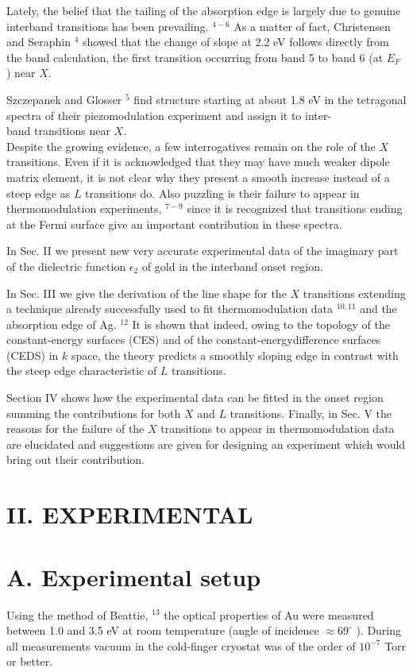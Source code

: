 \documentclass[10pt]{article}
\begin{document}
Lately, the belief that the tailing of the absorption edge is largely due to genuine interband transitions has been prevailing. ${ }^{4-6}$ As a matter of fact, Christensen and Seraphin ${ }^{4}$ showed that the change of slope at 2.2 eV follows directly from the band calculation, the first transition occurring from band 5 to band 6 (at $E_{F}$ ) near $X$.

Szczepanek and Glosser ${ }^{5}$ find structure starting at about 1.8 eV in the tetragonal spectra of their piezomodulation experiment and assign it to inter-\\
band transitions near $X$.\\
Despite the growing evidence, a few interrogatives remain on the role of the $X$ transitions. Even if it is acknowledged that they may have much weaker dipole matrix element, it is not clear why they present a smooth increase instead of a steep edge as $L$ transitions do. Also puzzling is their failure to appear in thermomodulation experiments, ${ }^{7-9}$ since it is recognized that transitions ending at the Fermi surface give an important contribution in these spectra.

In Sec. II we present new very accurate experimental data of the imaginary part of the dielectric function $\epsilon_{2}$ of gold in the interband onset region.

In Sec. III we give the derivation of the line shape for the $X$ transitions extending a technique already successfully used to fit thermomodulation data ${ }^{10,11}$ and the absorption edge of Ag. ${ }^{12}$ It is shown that indeed, owing to the topology of the constant-energy surfaces (CES) and of the constant-energydifference surfaces (CEDS) in $k$ space, the theory predicts a smoothly sloping edge in contrast with the steep edge characteristic of $L$ transitions.

Section IV shows how the experimental data can be fitted in the onset region summing the contributions for both $X$ and $L$ transitions. Finally, in Sec. V the reasons for the failure of the $X$ transitions to appear in thermomodulation data are elucidated and suggestions are given for designing an experiment which would bring out their contribution.

\section*{II. EXPERIMENTAL}
\section*{A. Experimental setup}
Using the method of Beattie, ${ }^{13}$ the optical properties of Au were measured between 1.0 and 3.5 eV at room temperature (angle of incidence $\approx 69^{\circ}$ ). During all measurements vacuum in the cold-finger cryostat was of the order of $10^{-7}$ Torr or better.
\end{document}
